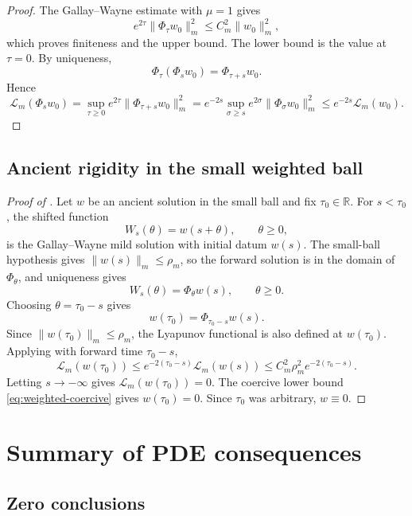 \documentclass[11pt]{amsart}
\theoremstyle{plain}
\theoremstyle{definition}
\theoremstyle{remark}
\numberwithin{equation}{section}
\begin{document}
\begin{proof}
The Gallay--Wayne estimate with \(\mu=1\) gives
\[
   e^{2\tau}\|\Phi_\tau w_0\|_m^2
   \le C_m^2\|w_0\|_m^2,
\]
which proves finiteness and the upper bound.  The lower bound is the value at
\(\tau=0\).  By uniqueness,
\[
   \Phi_\tau(\Phi_s w_0)=\Phi_{\tau+s}w_0 .
\]
Hence
\[
   \mathcal L_m(\Phi_s w_0)
   =
   \sup_{\tau\ge0}e^{2\tau}\|\Phi_{\tau+s}w_0\|_m^2
   =
   e^{-2s}\sup_{\sigma\ge s}e^{2\sigma}\|\Phi_\sigma w_0\|_m^2
   \le e^{-2s}\mathcal L_m(w_0).
\]
\end{proof}

\subsection{Ancient rigidity in the small weighted ball}

\begin{proof}[Proof of ]
Let \(w\) be an ancient solution in the small ball and fix
\(\tau_0\in\mathbb R\).  For \(s<\tau_0\), the shifted function
\[
   W_s(\theta)=w(s+\theta),\qquad \theta\ge0,
\]
is the Gallay--Wayne mild solution with initial datum \(w(s)\).  The small-ball
hypothesis gives \(\|w(s)\|_m\le\rho_m\), so the forward solution is in the
domain of \(\Phi_\theta\), and uniqueness gives
\[
   W_s(\theta)=\Phi_\theta w(s),\qquad \theta\ge0.
\]
Choosing \(\theta=\tau_0-s\) gives
\[
   w(\tau_0)=\Phi_{\tau_0-s}w(s).
\]
Since \(\|w(\tau_0)\|_m\le\rho_m\), the Lyapunov functional is also defined at
\(w(\tau_0)\).  Applying  with forward time
\(\tau_0-s\),
\[
   \mathcal L_m(w(\tau_0))
   \le
   e^{-2(\tau_0-s)}\mathcal L_m(w(s))
   \le
   C_m^2\rho_m^2e^{-2(\tau_0-s)} .
\]
Letting \(s\to-\infty\) gives \(\mathcal L_m(w(\tau_0))=0\).  The coercive
lower bound \eqref{eq:weighted-coercive} gives \(w(\tau_0)=0\).  Since
\(\tau_0\) was arbitrary, \(w\equiv0\).
\end{proof}

\section{Summary of PDE consequences}
\label{sec:summary}

\subsection{Zero conclusions}
\end{document}
